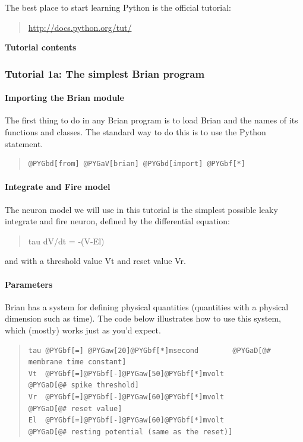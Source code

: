 \documentclass[letterpaper,10pt,english]{manual}
\begin{document}
The best place to start learning Python is the official tutorial:
\begin{quote}

\href{http://docs.python.org/tut/}{http://docs.python.org/tut/}
\end{quote}

\textbf{Tutorial contents}

\resetcurrentobjects
\hypertarget{--doc-tutorial_1a_the_simplest_brian_program}{}

\subsubsection{Tutorial 1a: The simplest Brian program}


\paragraph{Importing the Brian module}

The first thing to do in any Brian program is to load Brian and the names of
its functions and classes. The standard way to do this is to use the Python
 statement.
\begin{quote}

\begin{Verbatim}[commandchars=@\[\]]
@PYGbd[from] @PYGaV[brian] @PYGbd[import] @PYGbf[*]
\end{Verbatim}
\end{quote}


\paragraph{Integrate and Fire model}

The neuron model we will use in this tutorial is the simplest possible
leaky integrate and fire neuron, defined by the differential equation:
\begin{quote}

tau dV/dt = -(V-El)
\end{quote}

and with a threshold value Vt and reset value Vr.


\paragraph{Parameters}

Brian has a system for defining physical quantities (quantities with
a physical dimension such as time). The code below illustrates how
to use this system, which (mostly) works just as you'd expect.
\begin{quote}

\begin{Verbatim}[commandchars=@\[\]]
tau @PYGbf[=] @PYGaw[20]@PYGbf[*]msecond        @PYGaD[@# membrane time constant]
Vt  @PYGbf[=]@PYGbf[-]@PYGaw[50]@PYGbf[*]mvolt          @PYGaD[@# spike threshold]
Vr  @PYGbf[=]@PYGbf[-]@PYGaw[60]@PYGbf[*]mvolt          @PYGaD[@# reset value]
El  @PYGbf[=]@PYGbf[-]@PYGaw[60]@PYGbf[*]mvolt          @PYGaD[@# resting potential (same as the reset)]
\end{Verbatim}
\end{quote}
\end{document}
